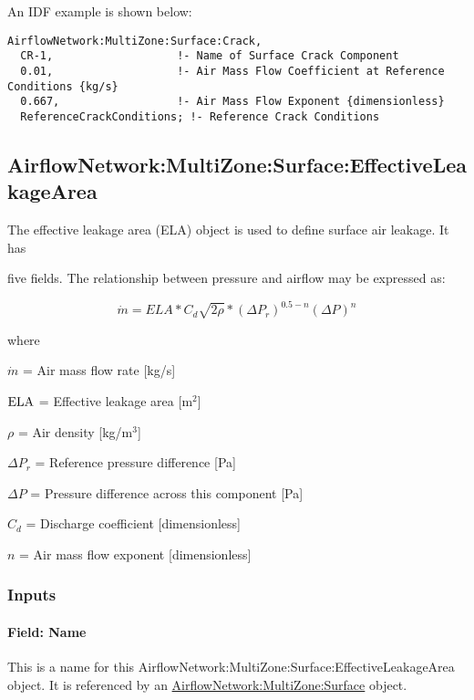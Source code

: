 An IDF example is shown below:

\begin{lstlisting}
AirflowNetwork:MultiZone:Surface:Crack,
  CR-1,                   !- Name of Surface Crack Component
  0.01,                   !- Air Mass Flow Coefficient at Reference Conditions {kg/s}
  0.667,                  !- Air Mass Flow Exponent {dimensionless}
  ReferenceCrackConditions; !- Reference Crack Conditions
\end{lstlisting}

\subsection{AirflowNetwork:MultiZone:Surface:EffectiveLeakageArea}\label{airflownetworkmultizonesurfaceeffectiveleakagearea}

The effective leakage area (ELA) object is used to define surface air leakage. It has

five fields. The relationship between pressure and airflow may be expressed as:

\begin{equation}
\dot m = ELA*{C_d}\sqrt {2\rho } *{\left( {\Delta {P_r}} \right)^{0.5 - n}}{\left( {\Delta P} \right)^n}
\end{equation}

where

\(\dot m\) = Air mass flow rate {[}kg/s{]}

\(\rm{ELA}\) = Effective leakage area {[}m\(^{2}\){]}

\(\rho\) = Air density {[}kg/m\(^{3}\){]}

\(\Delta {P_r}\) = Reference pressure difference {[}Pa{]}

\(\Delta P\) = Pressure difference across this component {[}Pa{]}

\(C_{d}\) = Discharge coefficient {[}dimensionless{]}

\(n\) = Air mass flow exponent {[}dimensionless{]}

\subsubsection{Inputs}\label{inputs-3-003}

\paragraph{Field: Name}\label{field-name-3-003}

This is a name for this AirflowNetwork:MultiZone:Surface:EffectiveLeakageArea object. It is referenced by an \hyperref[airflownetworkmultizonesurface]{AirflowNetwork:MultiZone:Surface} object.

